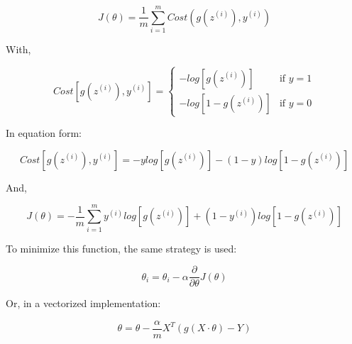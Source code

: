 \begin{equation} \label{}
    J(\theta) = \frac{1}{m} \sum_{i=1}^{m} Cost(g(z^{(i)}), y^{(i)})
\end{equation}

With,

\begin{equation}
    Cost[g(z^{(i)}), y^{(i)}] =
        \begin{cases}
            - log[g(z^{(i)})] & \text{if  } y = 1 \\
            - log[1- g(z^{(i)})] & \text{if  }  y = 0
        \end{cases}
\end{equation}

In equation form:

\begin{equation}
    Cost[g(z^{(i)}), y^{(i)}] = - y log[g(z^{(i)})] - (1 - y)log[1- g(z^{(i)})]
\end{equation}

And,

\begin{equation}
    J(\theta) = - \frac{1}{m} \sum_{i=1}^{m} y^{(i)} log[g(z^{(i)})] + (1 - y^{(i)})log[1- g(z^{(i)})]
\end{equation}

To minimize this function, the same strategy is used:

\begin{equation}
    \theta_{i} = \theta_{i} - \alpha \frac{\partial }{\partial \theta} J(\theta)
\end{equation}

Or, in a vectorized implementation:

\begin{equation}
    \theta = \theta - \frac{\alpha}{m} X^{T} (g(X\cdot\theta) - Y)
\end{equation}


